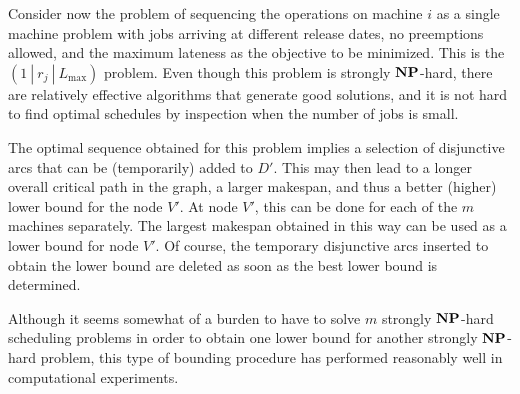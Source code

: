 Consider now the problem of sequencing the operations on machine $i$ 
as a single machine problem with jobs arriving at different release dates, 
no preemptions allowed, and the maximum lateness as the objective 
to be minimized. This is the $(1~|~r_j~|~L_{\max})$ problem. Even though 
this problem is strongly $\operatorname{\textbf{NP}}$-hard, there are relatively effective 
algorithms that generate good solutions, and it is not hard to 
find optimal schedules by inspection when the number of jobs is small. 

The optimal sequence obtained for this problem implies a selection of 
disjunctive arcs that can be (temporarily) added to $D'$. This may then 
lead to a longer overall critical path in the graph, a larger makespan, 
and thus a better (higher) lower bound for the node $V'$. At node $V'$, 
this can be done for each of the $m$ machines separately. The largest 
makespan obtained in this way can be used as a lower bound for node $V'$. 
Of course, the temporary disjunctive arcs inserted to obtain the lower 
bound are deleted as soon as the best lower bound is determined. 

Although it seems somewhat of a burden to have to solve $m$ strongly 
$\operatorname{\textbf{NP}}$-hard scheduling problems in order to obtain one lower bound 
for another strongly $\operatorname{\textbf{NP}}$-hard problem, this type of bounding procedure 
has performed reasonably well in computational experiments. 

